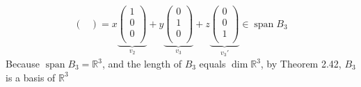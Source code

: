 \documentclass[12pt]{article}
\newcommand{\R}{\mathbb{R}}
\begin{document}
\begin{enumerate}
$$\begin{pmatrix}
        \end{pmatrix} = x \underbrace{
        \begin{pmatrix}
            1 \\ 0 \\ 0 \\ 
        \end{pmatrix}
    }_{v_2}
    + y
    \underbrace{
        \begin{pmatrix}
            0 \\ 1 \\ 0 \\ 
        \end{pmatrix}
    }_{v_3}
    + z
    \underbrace{
        \begin{pmatrix}
            0 \\ 0 \\ 1 \\ 
        \end{pmatrix}
    }_{v_3'} \in \operatorname{span}B_3$$
    Because $\operatorname{span}B_3 = \R^3$, and the length of $B_3$ equals $\operatorname{dim}\R^3$, by Theorem 2.42, $B_3$ is a basis of $\R^3$
    \vspace{0.5in}


\end{enumerate}
\end{document}
